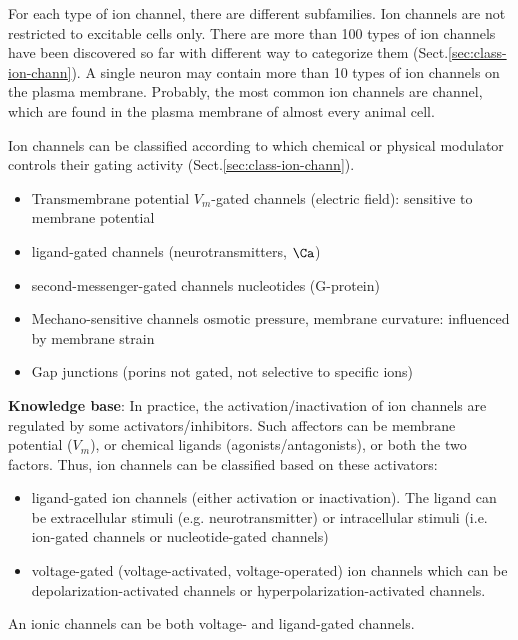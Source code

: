 For each type of ion channel, there are different subfamilies. Ion channels are
not restricted to excitable cells only.  There are more than 100 types of ion
channels have been discovered so far with different way to categorize them
(Sect.\ref{sec:class-ion-chann}). A single neuron may contain more than 10 types
of ion channels on the plasma membrane. Probably, the most common ion channels
are  channel, which are found in the plasma membrane of almost every
animal cell.


Ion channels can be classified according to which chemical or physical
modulator controls their gating activity (Sect.\ref{sec:class-ion-chann}).
\begin{itemize}
  \item Transmembrane potential $V_m$-gated channels (electric field): sensitive
  to membrane potential

  \item ligand-gated channels (neurotransmitters, $\Ca$)

  \item second-messenger-gated channels nucleotides (G-protein)

  \item Mechano-sensitive channels osmotic pressure, membrane curvature:
  influenced by membrane strain

  \item Gap junctions (porins not gated, not selective to specific ions)
\end{itemize}


\begin{mdframed}

{\bf Knowledge base}: In practice, the activation/inactivation of ion channels
are regulated by some activators/inhibitors. Such affectors can be membrane
potential ($V_m$), or chemical ligands (agonists/antagonists), or both the two
factors. Thus, ion channels can be classified based on these activators:
\begin{itemize}
  \item ligand-gated ion channels (either activation or
  inactivation). The ligand can be extracellular stimuli
  (e.g. neurotransmitter) or intracellular stimuli (i.e. ion-gated
  channels or nucleotide-gated channels)

  \item voltage-gated (voltage-activated, voltage-operated) ion channels
  which can be depolarization-activated channels or
  hyperpolarization-activated channels.
\end{itemize}
An ionic channels can be both voltage- and ligand-gated channels.

\end{mdframed}

